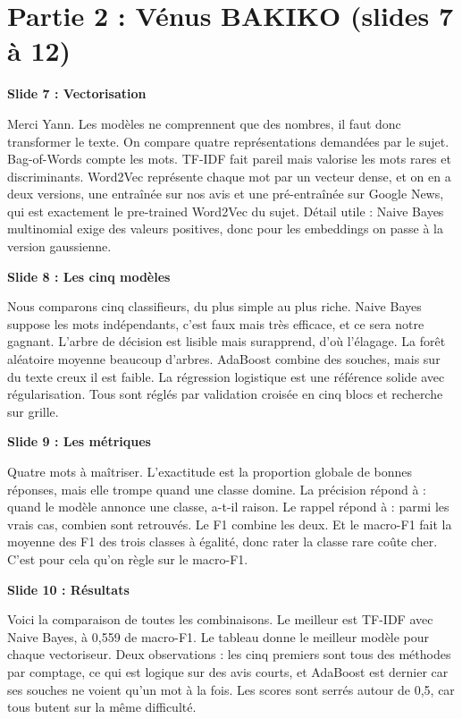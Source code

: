 \documentclass[11pt,a4paper]{article}
\newenvironment{turn}[2]%
{\begin{mdframed}[linewidth=0pt,backgroundcolor=panel,skipabove=6pt,skipbelow=6pt,
   innerleftmargin=10pt,innerrightmargin=10pt,innertopmargin=7pt,innerbottommargin=7pt,
   leftline=true,linecolor=#1,linewidth=3pt]%
 {\color{#1}\bfseries #2}\par\vspace{2pt}}
{\end{mdframed}}
\begin{document}
\section*{\textcolor{venus}{Partie 2 : Vénus BAKIKO (slides 7 à 12)}}

\begin{turn}{venus}{Slide 7 : Vectorisation}
Merci Yann. Les modèles ne comprennent que des nombres, il faut donc transformer le
texte. On compare quatre représentations demandées par le sujet. Bag-of-Words compte les
mots. TF-IDF fait pareil mais valorise les mots rares et discriminants. Word2Vec
représente chaque mot par un vecteur dense, et on en a deux versions, une entraînée sur
nos avis et une pré-entraînée sur Google News, qui est exactement le pre-trained Word2Vec
du sujet. Détail utile : Naive Bayes multinomial exige des valeurs positives, donc pour
les embeddings on passe à la version gaussienne.
\end{turn}

\begin{turn}{venus}{Slide 8 : Les cinq modèles}
Nous comparons cinq classifieurs, du plus simple au plus riche. Naive Bayes suppose les
mots indépendants, c'est faux mais très efficace, et ce sera notre gagnant. L'arbre de
décision est lisible mais surapprend, d'où l'élagage. La forêt aléatoire moyenne
beaucoup d'arbres. AdaBoost combine des souches, mais sur du texte creux il est faible.
La régression logistique est une référence solide avec régularisation. Tous sont réglés
par validation croisée en cinq blocs et recherche sur grille.
\end{turn}

\begin{turn}{venus}{Slide 9 : Les métriques}
Quatre mots à maîtriser. L'exactitude est la proportion globale de bonnes réponses, mais
elle trompe quand une classe domine. La précision répond à : quand le modèle annonce une
classe, a-t-il raison. Le rappel répond à : parmi les vrais cas, combien sont retrouvés.
Le F1 combine les deux. Et le macro-F1 fait la moyenne des F1 des trois classes à
égalité, donc rater la classe rare coûte cher. C'est pour cela qu'on règle sur le
macro-F1.
\end{turn}

\begin{turn}{venus}{Slide 10 : Résultats}
Voici la comparaison de toutes les combinaisons. Le meilleur est TF-IDF avec Naive Bayes,
à 0,559 de macro-F1. Le tableau donne le meilleur modèle pour chaque vectoriseur. Deux
observations : les cinq premiers sont tous des méthodes par comptage, ce qui est logique
sur des avis courts, et AdaBoost est dernier car ses souches ne voient qu'un mot à la
fois. Les scores sont serrés autour de 0,5, car tous butent sur la même difficulté.
\end{turn}
\end{document}
